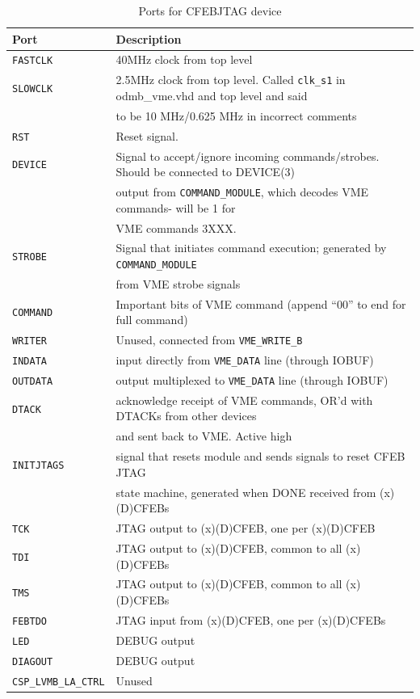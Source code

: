 \documentclass[10pt,a4paper]{article}
\begin{document}
\begin{table}[H]
\begin{tabular}{|l|l|} \hline
Port& Description\\ \hline
\texttt{FASTCLK}& 40MHz clock from top level\\ \hline
\texttt{SLOWCLK}& 2.5MHz clock from top level. Called \texttt{clk\_s1} in odmb\_vme.vhd and top level and said \\
       &to be 10 MHz/0.625 MHz in incorrect comments\\ \hline
\texttt{RST}& Reset signal.\\ \hline
\texttt{DEVICE}& Signal to accept/ignore incoming commands/strobes. Should be connected to DEVICE(3) \\
      & output from \texttt{COMMAND\_MODULE}, which decodes VME commands- will be 1 for \\
			& VME commands 3XXX.\\ \hline 
\texttt{STROBE}& Signal that initiates command execution; generated by \texttt{COMMAND\_MODULE} \\
      & from VME strobe signals\\ \hline
\texttt{COMMAND}& Important bits of VME command (append ``00'' to end for full command)\\ \hline
\texttt{WRITER}& Unused, connected from \texttt{VME\_WRITE\_B}\\ \hline
\texttt{INDATA}& input directly from \texttt{VME\_DATA} line (through IOBUF)\\ \hline
\texttt{OUTDATA}& output multiplexed to \texttt{VME\_DATA} line (through IOBUF)\\ \hline
\texttt{DTACK}& acknowledge receipt of VME commands, OR'd with DTACKs from other devices \\
     & and sent back to VME. Active high\\ \hline
\texttt{INITJTAGS}& signal that resets module and sends signals to reset CFEB JTAG \\
         & state machine, generated when DONE received from (x)(D)CFEBs\\ \hline
\texttt{TCK}& JTAG output to (x)(D)CFEB, one per (x)(D)CFEB\\ \hline
\texttt{TDI}& JTAG output to (x)(D)CFEB, common to all (x)(D)CFEBs\\ \hline
\texttt{TMS}& JTAG output to (x)(D)CFEB, common to all (x)(D)CFEBs\\ \hline
\texttt{FEBTDO}& JTAG input from (x)(D)CFEB, one per (x)(D)CFEBs\\ \hline
\texttt{LED}& DEBUG output\\ \hline
\texttt{DIAGOUT}& DEBUG output\\ \hline
\texttt{CSP\_LVMB\_LA\_CTRL}& Unused\\ \hline
\end{tabular}
\caption{Ports for CFEBJTAG device}
\label{tab:cfebjtaginterface}
\end{table}
\end{document}
